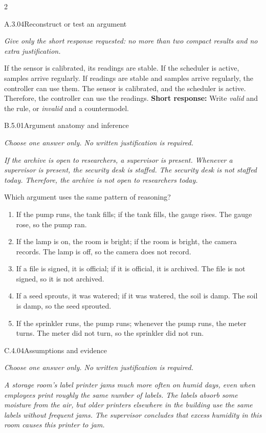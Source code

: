 \documentclass[9pt]{extarticle}
\newcommand{\choice}[1]{\item #1}
\begin{document}
\begin{multicols}{2}
\begin{DenseCoreProblem}{A.3.04}{Reconstruct or test an argument}
{\scriptsize\textit{Give only the short response requested: no more than two compact results and no extra justification.}\par}
If the sensor is calibrated, its readings are stable. If the scheduler is active, samples arrive regularly. If readings are stable and samples arrive regularly, the controller can use them. The sensor is calibrated, and the scheduler is active. Therefore, the controller can use the readings.
\textbf{Short response:} Write \emph{valid} and the rule, or \emph{invalid} and a countermodel.
\end{DenseCoreProblem}
\begin{DenseCoreProblem}{B.5.01}{Argument anatomy and inference}
{\scriptsize\textit{Choose one answer only. No written justification is required.}\par}
\emph{If the archive is open to researchers, a supervisor is present. Whenever a supervisor is present, the security desk is staffed. The security desk is not staffed today. Therefore, the archive is not open to researchers today.}

Which argument uses the same pattern of reasoning?
\begin{enumerate}[label=(\alph*)]
  \choice{If the pump runs, the tank fills; if the tank fills, the gauge rises. The gauge rose, so the pump ran.}
  \choice{If the lamp is on, the room is bright; if the room is bright, the camera records. The lamp is off, so the camera does not record.}
  \choice{If a file is signed, it is official; if it is official, it is archived. The file is not signed, so it is not archived.}
  \choice{If a seed sprouts, it was watered; if it was watered, the soil is damp. The soil is damp, so the seed sprouted.}
  \choice{If the sprinkler runs, the pump runs; whenever the pump runs, the meter turns. The meter did not turn, so the sprinkler did not run.}
\end{enumerate}
\end{DenseCoreProblem}
\columnbreak
\begin{DenseCoreProblem}{C.4.04}{Assumptions and evidence}
{\scriptsize\textit{Choose one answer only. No written justification is required.}\par}
\emph{A storage room's label printer jams much more often on humid days, even when employees print roughly the same number of labels. The labels absorb some moisture from the air, but older printers elsewhere in the building use the same labels without frequent jams. The supervisor concludes that excess humidity in this room causes this printer to jam.}


\end{DenseCoreProblem}
\end{multicols}
\end{document}
